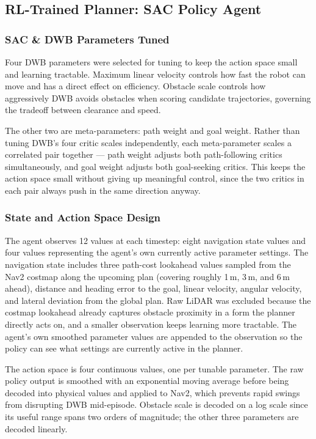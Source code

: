 \documentclass[conference]{IEEEtran}
\begin{document}
    \subsection{RL-Trained Planner: SAC Policy Agent}

    \subsubsection{SAC \& DWB Parameters Tuned}
    Four DWB parameters were selected for tuning to keep the action space small and learning tractable. Maximum linear velocity
    controls how fast the robot can move and has a direct effect on efficiency. Obstacle scale controls how aggressively DWB
    avoids obstacles when scoring candidate trajectories, governing the tradeoff between clearance and speed.

    The other two are meta-parameters: path weight and goal weight. Rather than tuning DWB's four critic scales independently,
    each meta-parameter scales a correlated pair together --- path weight adjusts both path-following critics simultaneously,
    and goal weight adjusts both goal-seeking critics. This keeps the action space small without giving up meaningful control,
    since the two critics in each pair always push in the same direction anyway.

    \subsubsection{State and Action Space Design}
    The agent observes 12 values at each timestep: eight navigation state values and four values representing the agent's own
    currently active parameter settings. The navigation state includes three path-cost lookahead values sampled from the Nav2
    costmap along the upcoming plan (covering roughly 1\,m, 3\,m, and 6\,m ahead), distance and heading error to the goal,
    linear velocity, angular velocity, and lateral deviation from the global plan. Raw LiDAR was excluded because the costmap
    lookahead already captures obstacle proximity in a form the planner directly acts on, and a smaller observation keeps
    learning more tractable. The agent's own smoothed parameter values are appended to the observation so the policy can see
    what settings are currently active in the planner.

    The action space is four continuous values, one per tunable parameter. The raw policy output is smoothed with an exponential
    moving average before being decoded into physical values and applied to Nav2, which prevents rapid swings from disrupting
    DWB mid-episode. Obstacle scale is decoded on a log scale since its useful range spans two orders of magnitude; the other
    three parameters are decoded linearly.
\end{document}
